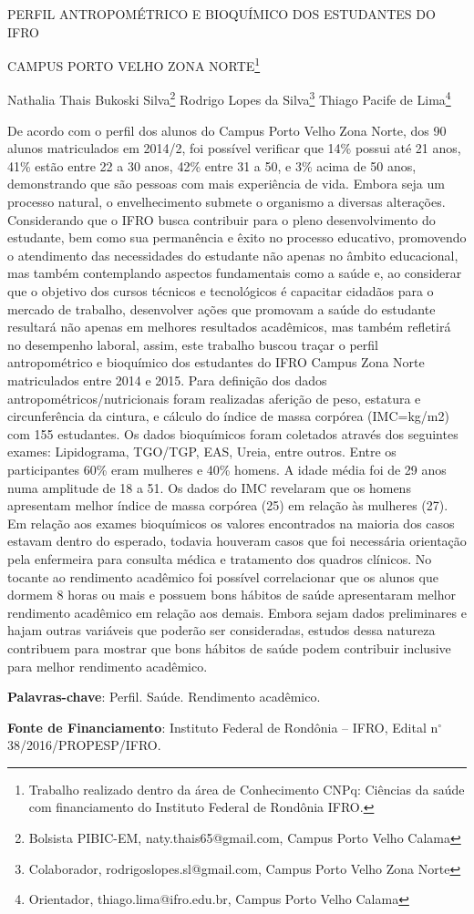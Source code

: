 \documentclass[article,12pt,onesidea,4paper,english,brazil]{abntex2}
\begin{document}
	
	
	\frenchspacing 
	
	\begin{center}
		\LARGE PERFIL ANTROPOMÉTRICO E BIOQUÍMICO DOS ESTUDANTES DO IFRO
		
		CAMPUS PORTO VELHO ZONA NORTE\footnote{Trabalho realizado dentro da área de Conhecimento CNPq: Ciências da saúde com financiamento
			do Instituto Federal de Rondônia IFRO.}
		
		\normalsize
		Nathalia Thais Bukoski Silva\footnote{Bolsista PIBIC-EM, naty.thais65@gmail.com, Campus Porto Velho Calama} 
		Rodrigo Lopes da Silva\footnote{Colaborador, rodrigoslopes.sl@gmail.com, Campus Porto Velho Zona Norte} 
		Thiago Pacife de Lima\footnote{Orientador, thiago.lima@ifro.edu.br, Campus Porto Velho Calama} 
		
	\end{center}
	
	\noindent De acordo com o perfil dos alunos do Campus Porto Velho Zona Norte, dos 90
	alunos matriculados em 2014/2, foi possível verificar que 14\% possui até 21 anos,
	41\% estão entre 22 a 30 anos, 42\% entre 31 a 50, e 3\% acima de 50 anos,
	demonstrando que são pessoas com mais experiência de vida. Embora seja um
	processo natural, o envelhecimento submete o organismo a diversas alterações.
	Considerando que o IFRO busca contribuir para o pleno desenvolvimento do
	estudante, bem como sua permanência e êxito no processo educativo, promovendo
	o atendimento das necessidades do estudante não apenas no âmbito educacional,
	mas também contemplando aspectos fundamentais como a saúde e, ao considerar
	que o objetivo dos cursos técnicos e tecnológicos é capacitar cidadãos para o
	mercado de trabalho, desenvolver ações que promovam a saúde do estudante
	resultará não apenas em melhores resultados acadêmicos, mas também refletirá no
	desempenho laboral, assim, este trabalho buscou traçar o perfil antropométrico e
	bioquímico dos estudantes do IFRO Campus Zona Norte matriculados entre 2014 e
	2015. Para definição dos dados antropométricos/nutricionais foram realizadas
	aferição de peso, estatura e circunferência da cintura, e cálculo do índice de massa
	corpórea (IMC=kg/m2) com 155 estudantes. Os dados bioquímicos foram coletados
	através dos seguintes exames: Lipidograma, TGO/TGP, EAS, Ureia, entre outros.
	Entre os participantes 60\% eram mulheres e 40\% homens. A idade média foi de 29
	anos numa amplitude de 18 a 51. Os dados do IMC revelaram que os homens
	apresentam melhor índice de massa corpórea (25) em relação às mulheres (27). Em
	relação aos exames bioquímicos os valores encontrados na maioria dos casos
	estavam dentro do esperado, todavia houveram casos que foi necessária orientação
	pela enfermeira para consulta médica e tratamento dos quadros clínicos. No tocante
	ao rendimento acadêmico foi possível correlacionar que os alunos que dormem 8
	horas ou mais e possuem bons hábitos de saúde apresentaram melhor rendimento
	acadêmico em relação aos demais. Embora sejam dados preliminares e hajam
	outras variáveis que poderão ser consideradas, estudos dessa natureza contribuem
	para mostrar que bons hábitos de saúde podem contribuir inclusive para melhor
	rendimento acadêmico.
	
	\vspace{\onelineskip}
	
	\noindent
	\textbf{Palavras-chave}: Perfil. Saúde. Rendimento acadêmico.
	
	\noindent
	\textbf{Fonte de Financiamento}: Instituto Federal de Rondônia – IFRO, Edital n$^{\circ}$
	38/2016/PROPESP/IFRO.
	
\end{document}
